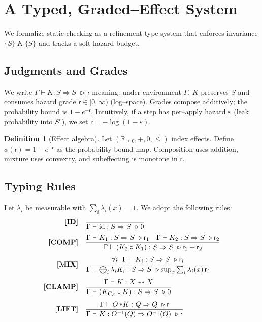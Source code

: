 \documentclass[11pt]{article}
\theoremstyle{definition}
\newtheorem{definition}{Definition}[section]
\theoremstyle{plain}
\theoremstyle{remark}
\newcommand{\X}{X}
\newcommand{\1}{\mathbf{1}}
\newcommand{\iden}{\mathrm{id}}
\newcommand{\RR}{\mathbb{R}}
\newcommand{\pushfwd}{\mathbin{\!\!\;\raisebox{0.2ex}{\small$\ast$}\!}}
\newcommand{\clamp}{C}
\newcommand{\grade}{\mathsf{r}}
\begin{document}
\section{A Typed, Graded--Effect System}
We formalize static checking as a refinement type system that enforces invariance $\{S\}\ K\ \{S\}$ and tracks a soft hazard budget.

\subsection{Judgments and Grades}
We write $\Gamma\vdash K:S\Rightarrow S\;\triangleright \grade$ meaning: under environment $\Gamma$, $K$ preserves $S$ and consumes hazard grade $\grade\in[0,\infty)$ (log--space). Grades compose additively; the probability bound is $1-e^{-\grade}$. Intuitively, if a step has per--apply hazard $\varepsilon$ (leak probability into $S^c$), we set $\grade=-\log(1-\varepsilon)$.

\begin{definition}[Effect algebra]\label{def:effect}
Let $(\RR_{\ge 0},+,0,\le)$ index effects. Define $\phi(\grade)=1-e^{-\grade}$ as the probability bound map. Composition uses addition, mixture uses convexity, and subeffecting is monotone in $\grade$.
\end{definition}

\subsection{Typing Rules}
Let $\lambda_i$ be measurable with $\sum_i\lambda_i(x)=1$. We adopt the following rules:
\begin{align*}
\textbf{[ID]}&\ \ \ \frac{}{\Gamma\vdash \iden: S\Rightarrow S\ \triangleright 0}\\[4pt]
\textbf{[COMP]}&\ \ \ \frac{\Gamma\vdash K_1:S\Rightarrow S\ \triangleright \grade_1\quad \Gamma\vdash K_2:S\Rightarrow S\ \triangleright \grade_2}{\Gamma\vdash (K_2\circ K_1):S\Rightarrow S\ \triangleright \grade_1+\grade_2}\\[4pt]
\textbf{[MIX]}&\ \ \ \frac{\forall i.\ \Gamma\vdash K_i:S\Rightarrow S\ \triangleright \grade_i}{\Gamma\vdash \bigoplus_i \lambda_i K_i:S\Rightarrow S\ \triangleright \sup_x \sum_i \lambda_i(x)\,\grade_i}\\[4pt]
\textbf{[CLAMP]}&\ \ \ \frac{\Gamma\vdash K:\X\rightsquigarrow \X}{\Gamma\vdash (K_{\clamp_S}\circ K):S\Rightarrow S\ \triangleright 0}\\[4pt]
\textbf{[LIFT]}&\ \ \ \frac{\Gamma\vdash O\pushfwd K: Q\Rightarrow Q\ \triangleright \grade}{\Gamma\vdash K: O^{-1}(Q)\Rightarrow O^{-1}(Q)\ \triangleright \grade}
\end{align*}
\end{document}
